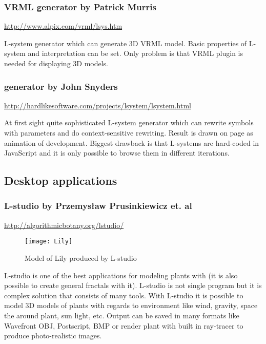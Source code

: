 \subsubsection{VRML \lsystem generator by Patrick Murris}
{ \vspace{-10pt} \footnotesize \url{http://www.alpix.com/vrml/lsys.htm} }
  
L-system generator which can generate 3D VRML model.
Basic properties of L-system and interpretation can be set.
Only problem is that VRML plugin is needed for displaying 3D models.


\subsubsection{\lsystem generator by John Snyders}
{ \vspace{-10pt} \footnotesize \url{http://hardlikesoftware.com/projects/lsystem/lsystem.html} }
  
At first sight quite sophisticated L-system generator which can rewrite symbols with parameters and do context-sensitive rewriting.
Result is drawn on page as animation of development.
Biggest drawback is that L-systems are hard-coded in JavaScript and it is only possible to browse them in different iterations.



\subsection{Desktop applications}
\label{sec:DesktopGenerators}

\subsubsection{L-studio by Przemysław Prusinkiewicz et. al}
{ \vspace{-10pt} \footnotesize \url{http://algorithmicbotany.org/lstudio/} }

\begin{wrapfigure}{r}{0.5\textwidth}
	\vspace{-20pt}
	\begin{center}
	\texttt{[image: Lily]}
	\end{center}
	\caption{Model of Lily produced by L-studio}
\end{wrapfigure}

L-studio is one of the best applications for modeling plants with \lsystems (it is also possible to create general fractals with it).
L-studio is not single program but it is complex solution that consists of many tools.
With L-studio it is possible to model 3D models of plants with regards to environment like wind, gravity, space the around plant, sun light, etc.
Output can be saved in many formats like Wavefront OBJ, Postscript, BMP or render plant with built in ray-tracer to produce photo-realistic images.

